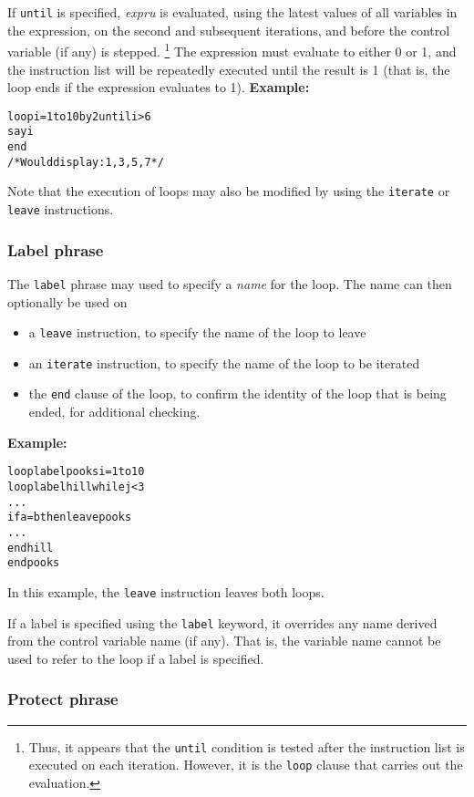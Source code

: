 \begin{description}
If \texttt{until} is specified, \emph{expru} is evaluated, using the
latest values of all variables in the expression, on the second and
subsequent iterations, and before the control variable (if any) is stepped.
\footnote{
Thus, it appears that the \texttt{until} condition is tested after the
instruction list is executed on each iteration.
However, it is the \texttt{loop} clause that carries out the evaluation.
}
The expression must evaluate to either 0 or 1, and the instruction list
will be repeatedly executed until the result is 1 (that is, the loop
ends if the expression evaluates to 1).
 \textbf{Example:}
\begin{alltt}
loop i=1 to 10 by 2 until i>6
  say i
  end
/* Would display: 1, 3, 5, 7 */
\end{alltt}
\end{description}
 Note that the execution of loops may also be modified by
using the \texttt{iterate} or \texttt{leave} instructions.
\subsubsection{Label phrase}
 
The \texttt{label} phrase may used to specify a \emph{name} for the
loop.  The name can then optionally be used on
\begin{itemize}
\item a \texttt{leave} instruction, to specify the name of the loop to leave
\item an \texttt{iterate} instruction, to specify the name of the loop to
be iterated
\item the \texttt{end} clause of the loop, to confirm the identity of the
loop that is being ended, for additional checking.
\end{itemize}
 \textbf{Example:}
\begin{alltt}
loop label pooks i=1 to 10
  loop label hill while j<3
    ...
    if a=b then leave pooks
    ...
    end hill
  end pooks
\end{alltt}
In this example, the \texttt{leave} instruction leaves both loops.
 
If a label is specified using the \texttt{label} keyword, it overrides
any name derived from the control variable name (if any).  That is, the
variable name cannot be used to refer to the loop if a label is
specified.
\subsubsection{Protect phrase}
 
